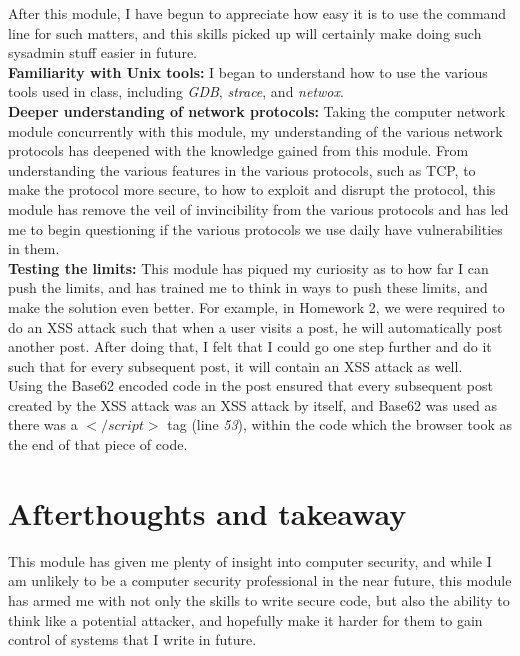 \documentclass[12pt]{article}
\begin{document}
After this module, I have begun to appreciate how easy it is to use the command line for such matters, and this skills picked up will certainly make doing such sysadmin stuff easier in future. \\

\textbf{Familiarity with Unix tools:} I began to understand how to use the various tools used in class, including \emph{GDB}, \emph{strace}, and \emph{netwox}. \\

\textbf{Deeper understanding of network protocols:} Taking the computer network module concurrently with this module, my understanding of the various network protocols has deepened with the knowledge gained from this module. From understanding the various features in the various protocols, such as TCP, to make the protocol more secure, to how to exploit and disrupt the protocol, this module has remove the veil of invincibility from the various protocols and has led me to begin questioning if the various protocols we use daily have vulnerabilities in them. \\ 

\textbf{Testing the limits:} This module has piqued my curiosity as to how far I can push the limits, and has trained me to think in ways to push these limits, and make the solution even better. For example, in Homework 2, we were required to do an XSS attack such that when a user visits a post, he will automatically post another post. After doing that, I felt that I could go one step further and do it such that for every subsequent post, it will contain an XSS attack as well. \\






Using the Base62 encoded code in the post ensured that every subsequent post created by the XSS attack was an XSS attack by itself, and Base62 was used as there was a $</script>$ tag (line \emph{53}), within the code which the browser took as the end of that piece of code. \\

\section{Afterthoughts and takeaway}
This module has given me plenty of insight into computer security, and while I am unlikely to be a computer security professional in the near future, this module has armed me with not only the skills to write secure code, but also the ability to think like a potential attacker, and hopefully make it harder for them to gain control of systems that I write in future.

\enddocument
\end{document}

